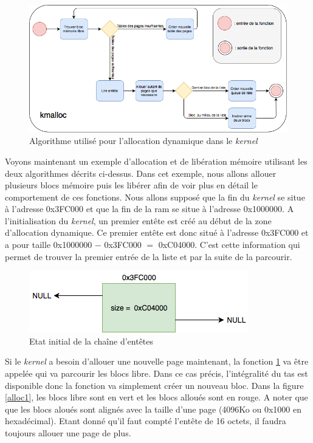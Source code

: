 \begin{figure}[!h]
  \centering
  \includegraphics[scale=0.6]{images/kmalloc.png}
  \caption{Algorithme utilisé pour l'allocation dynamique dans le \textit{kernel}}
  \label{kmalloc}
\end{figure}

Voyons maintenant un exemple d'allocation et de libération mémoire utilisant les
deux algorithmes décrits ci-dessus. Dans cet exemple, nous allons allouer plusieurs
blocs mémoire puis les libérer afin de voir plus en détail le comportement
de ces fonctions. Nous allons supposé que la fin du \textit{kernel} se situe
à l'adresse 0x3FC000 et que la fin de la \acrshort{ram} se situe à l'adresse
0x1000000. A l'initialisation du \textit{kernel}, un premier entête est créé au
début de la zone d'allocation dynamique. Ce premier entête est donc situé à
l'adresse 0x3FC000 et a pour taille 0x1000000 $-$ 0x3FC000 $=$ 0xC04000. C'est cette
information qui permet de trouver la premier entrée de la liste et par la suite
de la parcourir.

\begin{figure}[!h]
  \centering
  \includegraphics[scale=0.7]{images/alloc0.png}
  \caption{Etat initial de la chaîne d'entêtes}
  \label{alloc0}
\end{figure}

Si le \textit{kernel} a besoin d'allouer une nouvelle page maintenant, la fonction
\ref{kmalloc} va être appelée qui va parcourir les blocs libre. Dans ce cas précis,
l'intégralité du tas est disponible donc la fonction va simplement créer un nouveau
bloc. Dans la figure \ref{alloc1}, les blocs libre sont en vert et les blocs alloués
sont en rouge. A noter que que les blocs aloués sont alignés avec la taille d'une
page (4096Ko ou 0x1000 en hexadécimal). Etant donné qu'il faut compté l'entête
de 16 octets, il faudra toujours allouer une page de plus.

